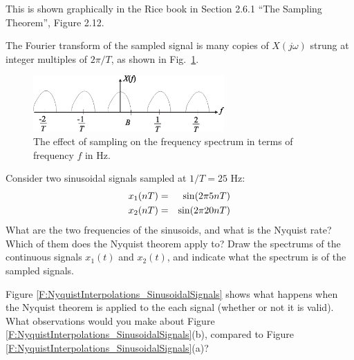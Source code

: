 This is shown graphically in the Rice book in Section 2.6.1 ``The Sampling Theorem'', Figure 2.12.

The Fourier transform of the sampled signal is many copies of $X(j\omega)$
strung at integer multiples of $2\pi /T$, as shown in
Fig.~\ref{F:Sampling-FreqDomain}.

\begin{figure}[htbp]
  \centerline{ \includegraphics[width=0.65\textwidth]{../images/Sampling-FreqDomain_bandwidthB_f.eps}}
  \caption{The effect of sampling on the frequency spectrum in terms of frequency $f$ in Hz.}
  \label{F:Sampling-FreqDomain}
\end{figure}

 Consider two
sinusoidal signals sampled at $1/T = 25$ Hz:
\begin{eqnarray}
  x_1(nT) &=& \sin(2 \pi 5 n T) \nonumber \\ 
  x_2(nT) &=& \sin(2 \pi 20 n T) \nonumber
\end{eqnarray}
What are the two frequencies of the sinusoids, and what is the
Nyquist rate?  Which of them does the Nyquist theorem apply to? Draw
the spectrums of the continuous signals $x_1(t)$ and $x_2(t)$, and
indicate what the spectrum is of the sampled signals.

Figure \ref{F:NyquistInterpolations_SinusoidalSignals} shows what
happens when the Nyquist theorem is applied to the each signal
(whether or not it is valid).  What observations would you make
about Figure \ref{F:NyquistInterpolations_SinusoidalSignals}(b),
compared to Figure
\ref{F:NyquistInterpolations_SinusoidalSignals}(a)?

